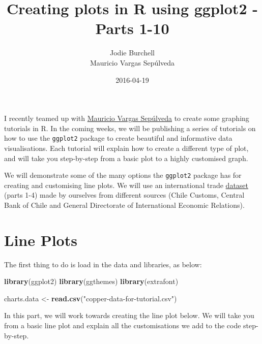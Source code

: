 \documentclass[]{article}
\title{Creating plots in R using ggplot2 - Parts 1-10}
\author{Jodie Burchell \\ Mauricio Vargas Sepúlveda}
\date{2016-04-19}
\newenvironment{Shaded}{\begin{snugshade}}{\end{snugshade}}
\newcommand{\KeywordTok}[1]{\textcolor[rgb]{0.13,0.29,0.53}{\textbf{{#1}}}}
\newcommand{\StringTok}[1]{\textcolor[rgb]{0.31,0.60,0.02}{{#1}}}
\newcommand{\NormalTok}[1]{{#1}}
\begin{document}
\maketitle

{
\setcounter{tocdepth}{2}
\tableofcontents
}
I recently teamed up with \href{http://pachamaltese.github.io/}{Mauricio
Vargas Sepúlveda} to create some graphing tutorials in R. In the coming
weeks, we will be publishing a series of tutorials on how to use the
\texttt{ggplot2} package to create beautiful and informative data
visualisations. Each tutorial will explain how to create a different
type of plot, and will take you step-by-step from a basic plot to a
highly customised graph.

We will demonstrate some of the many options the \texttt{ggplot2}
package has for creating and customising line plots. We will use an
international trade
\href{http://pachamaltese.github.io/stats/trade-chile-china/copper-data-for-tutorial.csv}{dataset}
(parts 1-4) made by ourselves from different sources (Chile Customs,
Central Bank of Chile and General Directorate of International Economic
Relations).

\section{Line Plots}\label{line-plots}

The first thing to do is load in the data and libraries, as below:

\begin{Shaded}
\begin{Highlighting}[]
\KeywordTok{library}\NormalTok{(ggplot2)}
\KeywordTok{library}\NormalTok{(ggthemes)}
\KeywordTok{library}\NormalTok{(extrafont)}

\NormalTok{charts.data <-}\StringTok{ }\KeywordTok{read.csv}\NormalTok{(}\StringTok{"copper-data-for-tutorial.csv"}\NormalTok{)}
\end{Highlighting}
\end{Shaded}

In this part, we will work towards creating the line plot below. We will
take you from a basic line plot and explain all the customisations we
add to the code step-by-step.
\end{document}
